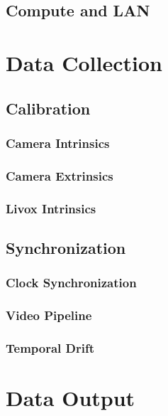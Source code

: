 \documentclass{erauthesis}
\begin{document}
        \subsection{Compute and LAN}
        
    \section{Data Collection}
    
        \subsection{Calibration}
        
            \subsubsection{Camera Intrinsics}
            
            \subsubsection{Camera Extrinsics}
            
            \subsubsection{Livox Intrinsics}
            
        \subsection{Synchronization}
        
            \subsubsection{Clock Synchronization}
            
            \subsubsection{Video Pipeline}
            
            \subsubsection{Temporal Drift}
            
    \section{Data Output}
\end{document}
